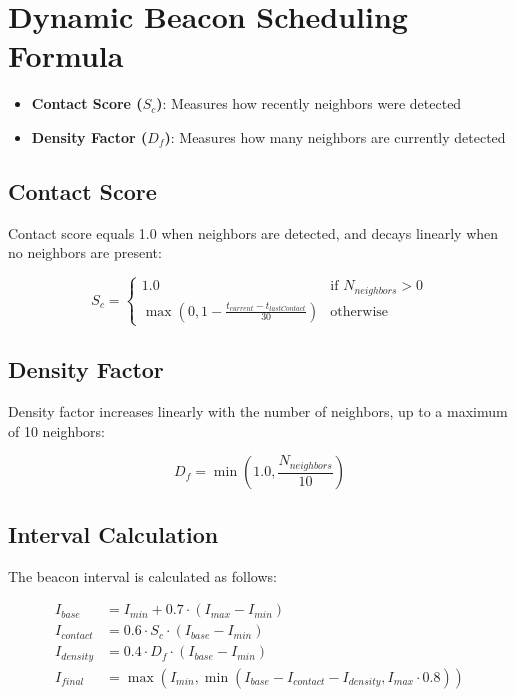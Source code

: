 \documentclass{article}
\begin{document}
\section{Dynamic Beacon Scheduling Formula}

\begin{itemize}
    \item \textbf{Contact Score ($S_c$)}: Measures how recently neighbors were detected
    \item \textbf{Density Factor ($D_f$)}: Measures how many neighbors are currently detected
\end{itemize}

\subsection{Contact Score}
Contact score equals 1.0 when neighbors are detected, and decays linearly when no neighbors are present:

\begin{equation}
S_c = 
\begin{cases} 
1.0 & \text{if } N_{neighbors} > 0 \\
\max(0, 1 - \frac{t_{current} - t_{lastContact}}{30}) & \text{otherwise}
\end{cases}
\end{equation}

\subsection{Density Factor}
Density factor increases linearly with the number of neighbors, up to a maximum of 10 neighbors:

\begin{equation}
D_f = \min(1.0, \frac{N_{neighbors}}{10})
\end{equation}

\subsection{Interval Calculation}
The beacon interval is calculated as follows:

\begin{equation}
\begin{aligned}
I_{base} &= I_{min} + 0.7 \cdot (I_{max} - I_{min}) \\
I_{contact} &= 0.6 \cdot S_c \cdot (I_{base} - I_{min}) \\
I_{density} &= 0.4 \cdot D_f \cdot (I_{base} - I_{min}) \\
I_{final} &= \max(I_{min}, \min(I_{base} - I_{contact} - I_{density}, I_{max} \cdot 0.8))
\end{aligned}
\end{equation}
\end{document}
